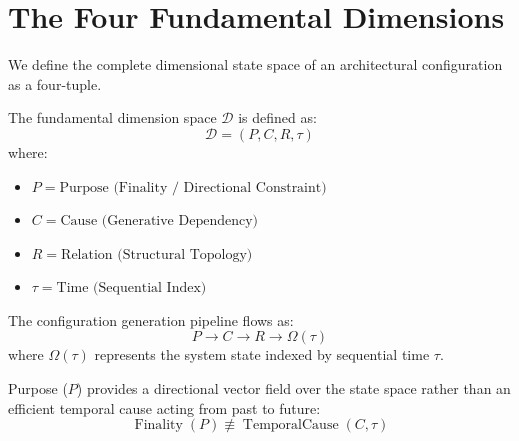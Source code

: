 \section{The Four Fundamental Dimensions}
\label{sec:four_layers}

We define the complete dimensional state space of an architectural configuration as a four-tuple.

\begin{definition}
The fundamental dimension space $\mathcal{D}$ is defined as:
\begin{equation}
\mathcal{D} = (P, C, R, \tau)
\end{equation}
where:
\begin{itemize}
    \item $P = \text{Purpose (Finality / Directional Constraint)}$
    \item $C = \text{Cause (Generative Dependency)}$
    \item $R = \text{Relation (Structural Topology)}$
    \item $\tau = \text{Time (Sequential Index)}$
\end{itemize}
\end{definition}

The configuration generation pipeline flows as:
\begin{equation}
P \longrightarrow C \longrightarrow R \longrightarrow \Omega(\tau)
\end{equation}
where $\Omega(\tau)$ represents the system state indexed by sequential time $\tau$.

\begin{proposition}
Purpose ($P$) provides a directional vector field over the state space rather than an efficient temporal cause acting from past to future:
\begin{equation}
\operatorname{Finality}(P) \not\equiv \operatorname{TemporalCause}(C, \tau)
\end{equation}
\end{proposition}
